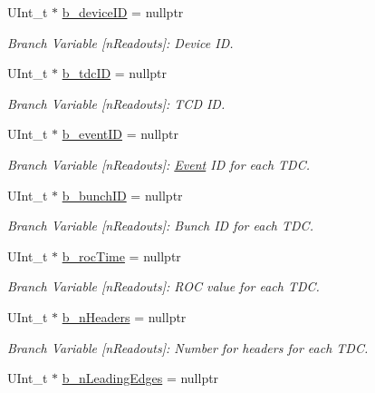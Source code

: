 \begin{DoxyCompactItemize}
U\+Int\+\_\+t $\ast$ \hyperlink{class_event_tree_manager_ab715e26f142e12ccd0e4ed6751959f0f}{b\+\_\+device\+ID} = nullptr
\begin{DoxyCompactList}\small\item\em Branch Variable \mbox{[}n\+Readouts\mbox{]}\+: Device ID. \end{DoxyCompactList}\item 
U\+Int\+\_\+t $\ast$ \hyperlink{class_event_tree_manager_a0e8cb571dd8ffe1295e9e31ce45c5d82}{b\+\_\+tdc\+ID} = nullptr
\begin{DoxyCompactList}\small\item\em Branch Variable \mbox{[}n\+Readouts\mbox{]}\+: T\+CD ID. \end{DoxyCompactList}\item 
U\+Int\+\_\+t $\ast$ \hyperlink{class_event_tree_manager_a3dea1a727165f6864be347642fc0728f}{b\+\_\+event\+ID} = nullptr
\begin{DoxyCompactList}\small\item\em Branch Variable \mbox{[}n\+Readouts\mbox{]}\+: \hyperlink{class_event}{Event} ID for each T\+DC. \end{DoxyCompactList}\item 
U\+Int\+\_\+t $\ast$ \hyperlink{class_event_tree_manager_a4953fdf79783fdd5c0b867af1dbd8f3d}{b\+\_\+bunch\+ID} = nullptr
\begin{DoxyCompactList}\small\item\em Branch Variable \mbox{[}n\+Readouts\mbox{]}\+: Bunch ID for each T\+DC. \end{DoxyCompactList}\item 
U\+Int\+\_\+t $\ast$ \hyperlink{class_event_tree_manager_acc8b0c67ad8e331ea9fc3f94a57d072b}{b\+\_\+roc\+Time} = nullptr
\begin{DoxyCompactList}\small\item\em Branch Variable \mbox{[}n\+Readouts\mbox{]}\+: R\+OC value for each T\+DC. \end{DoxyCompactList}\item 
U\+Int\+\_\+t $\ast$ \hyperlink{class_event_tree_manager_ac85cc79e72eaec4f7554a10e12e4d75a}{b\+\_\+n\+Headers} = nullptr
\begin{DoxyCompactList}\small\item\em Branch Variable \mbox{[}n\+Readouts\mbox{]}\+: Number for headers for each T\+DC. \end{DoxyCompactList}\item 
U\+Int\+\_\+t $\ast$ \hyperlink{class_event_tree_manager_ac32836178a53f00fe5417e533a0390f1}{b\+\_\+n\+Leading\+Edges} = nullptr

\end{DoxyCompactItemize}
